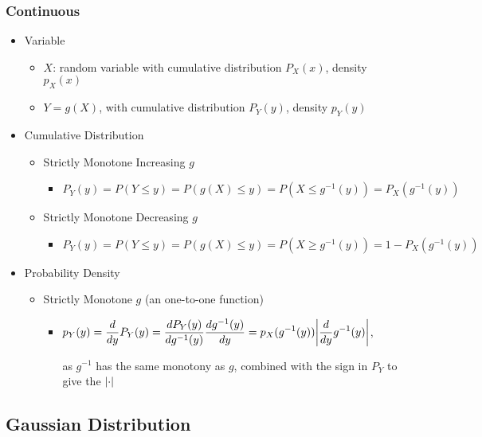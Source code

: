 \subsubsection{Continuous}
\begin{itemize}
\item Variable
	\begin{itemize}
	\item $X$: random variable with cumulative distribution $P_X(x)$, density $p_X(x)$
	\item $Y=g(X)$, with cumulative distribution $P_Y(y)$, density $p_Y(y)$
	\end{itemize}

\item Cumulative Distribution
	\begin{itemize}
	\item Strictly Monotone Increasing $g$
		\begin{itemize}
		\item $P_Y(y) = P(Y\le y) = P(g(X) \le y) = P(X \le g^{-1}(y)) = P_X(g^{-1}(y))$
		\end{itemize}
	\item Strictly Monotone Decreasing $g$
		\begin{itemize}
		\item $P_Y(y) = P(Y\le y) = P(g(X) \le y) = P(X \ge g^{-1}(y)) = 1 - P_X(g^{-1}(y))$
		\end{itemize}
	\end{itemize}

\item Probability Density
	\begin{itemize}
	\item Strictly Monotone $g$ (an one-to-one function)
		\begin{itemize}
		\item $\displaystyle p_Y(y) = \frac d {dy} P_Y(y) = \frac {d P_Y(y)}{d\space  g^{-1}(y)} \frac{d \space g^{-1}(y)}{dy} = p_X(g^{-1}(y)) \abs*{\frac{d}{dy} g^{-1}(y)}$, 
		
		as $g^{-1}$ has the same monotony as $g$, combined with the sign in $P_Y$ to give the $\abs*\cdot$
		
		\end{itemize}
	\end{itemize}
\end{itemize}


\subsection{Gaussian Distribution}
 
